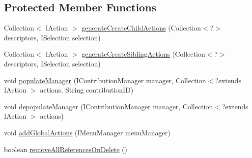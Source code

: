 \subsection*{Protected Member Functions}
\begin{DoxyCompactItemize}
\item 
Collection$<$ I\-Action $>$ \hyperlink{classshootingmachineemfmodel_1_1presentation_1_1_shootingmachineemfmodel_action_bar_contributor_a5c2676f75923984a7ad298abd7f3181f}{generate\-Create\-Child\-Actions} (Collection$<$?$>$ descriptors, I\-Selection selection)
\item 
Collection$<$ I\-Action $>$ \hyperlink{classshootingmachineemfmodel_1_1presentation_1_1_shootingmachineemfmodel_action_bar_contributor_a02650f6b4025b4650e5e0d7629888fbf}{generate\-Create\-Sibling\-Actions} (Collection$<$?$>$ descriptors, I\-Selection selection)
\item 
void \hyperlink{classshootingmachineemfmodel_1_1presentation_1_1_shootingmachineemfmodel_action_bar_contributor_a81b2bc1cd0b3b2cad927bcc86ec11dc1}{populate\-Manager} (I\-Contribution\-Manager manager, Collection$<$?extends I\-Action $>$ actions, String contribution\-I\-D)
\item 
void \hyperlink{classshootingmachineemfmodel_1_1presentation_1_1_shootingmachineemfmodel_action_bar_contributor_ab7e41697c1ac22641dc1496df106df76}{depopulate\-Manager} (I\-Contribution\-Manager manager, Collection$<$?extends I\-Action $>$ actions)
\item 
void \hyperlink{classshootingmachineemfmodel_1_1presentation_1_1_shootingmachineemfmodel_action_bar_contributor_adbd25d06c16f359ab2c2fb7b85d752b6}{add\-Global\-Actions} (I\-Menu\-Manager menu\-Manager)
\item 
boolean \hyperlink{classshootingmachineemfmodel_1_1presentation_1_1_shootingmachineemfmodel_action_bar_contributor_a13919a518d14689553c6bb1c2115534a}{remove\-All\-References\-On\-Delete} ()
\end{DoxyCompactItemize}
